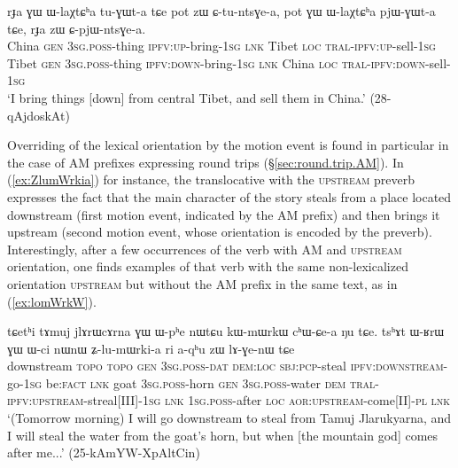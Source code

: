 \begin{exe}
\ex \label{ex:CpjWntGea}
\gll rɟa ɣɯ ɯ-laχtɕʰa tu-ɣɯt-a tɕe pot zɯ ɕ-tu-ntsɣe-a, pot ɣɯ ɯ-laχtɕʰa pjɯ-ɣɯt-a tɕe, rɟa zɯ ɕ-pjɯ-ntsɣe-a. \\
China \textsc{gen} \textsc{3sg}.\textsc{poss}-thing  \textsc{ipfv}:\textsc{up}-bring-\textsc{1sg} \textsc{lnk} Tibet \textsc{loc} \textsc{tral}-\textsc{ipfv}:\textsc{up}-sell-\textsc{1sg}  Tibet \textsc{gen} \textsc{3sg}.\textsc{poss}-thing  \textsc{ipfv}:\textsc{down}-bring-\textsc{1sg} \textsc{lnk} China \textsc{loc} \textsc{tral}-\textsc{ipfv}:\textsc{down}-sell-\textsc{1sg} \\
\glt `I bring things [down] from central Tibet, and sell them in China.' (28-qAjdoskAt)
\end{exe}

Overriding of the lexical orientation by the motion event is found in particular in the case of AM prefixes expressing round trips (§\ref{sec:round.trip.AM}). In (\ref{ex:ZlumWrkia}) for instance, the translocative  with the \textsc{upstream} preverb expresses the fact that the main character of the story steals from a place located downstream (first motion event, indicated by the AM prefix) and then brings it upstream (second motion event, whose orientation is encoded by the preverb). Interestingly, after a few occurrences of the verb  with AM and \textsc{upstream} orientation, one finds examples of that verb with the same non-lexicalized orientation \textsc{upstream} but without the AM prefix in the same text, as in (\ref{ex:lomWrkW}).

\begin{exe}
\ex \label{ex:ZlumWrkia}
 \gll tɕetʰi tɤmuj jlɤrɯcɤrna ɣɯ ɯ-pʰe nɯtɕu kɯ-mɯrkɯ cʰɯ-ɕe-a ŋu tɕe. tsʰɤt ɯ-ʁrɯ ɣɯ ɯ-ci nɯnɯ ʑ-lu-mɯrki-a ri a-qʰu zɯ lɤ-ɣe-nɯ tɕe \\
 downstream  \textsc{topo} \textsc{topo} \textsc{gen} \textsc{3sg}.\textsc{poss}-\textsc{dat} \textsc{dem}:\textsc{loc}  \textsc{sbj}:\textsc{pcp}-steal  \textsc{ipfv}:\textsc{downstream}-go-\textsc{1sg} be:\textsc{fact} \textsc{lnk}  goat \textsc{3sg}.\textsc{poss}-horn \textsc{gen} \textsc{3sg}.\textsc{poss}-water \textsc{dem} \textsc{tral}-\textsc{ipfv}:\textsc{upstream}-streal[III]-\textsc{1sg} \textsc{lnk} \textsc{1sg}.\textsc{poss}-after \textsc{loc} \textsc{aor}:\textsc{upstream}-come[II]-\textsc{pl} \textsc{lnk}  \\
 \glt `(Tomorrow  morning) I will go downstream to steal from Tamuj Jlarukyarna, and I will steal the water from the goat's horn, but when [the mountain god] comes after me...' (25-kAmYW-XpAltCin)
\end{exe}

